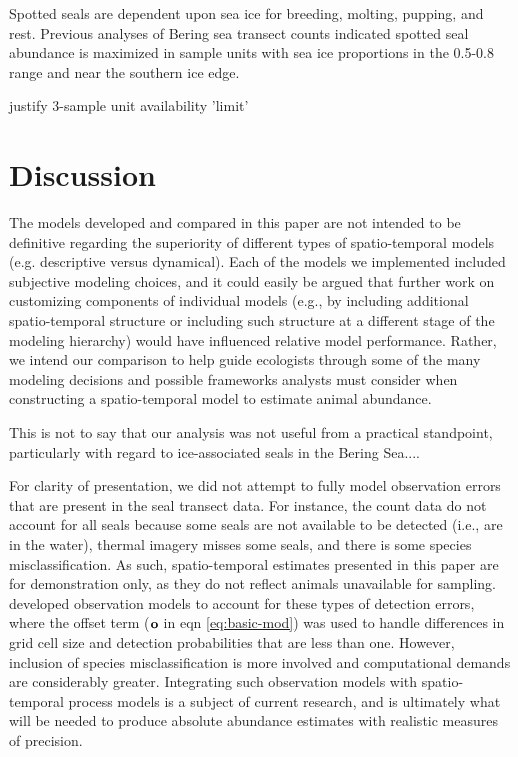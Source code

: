 \documentclass[times,mee,doublespace,]{besauth2}
\begin{document}
Spotted seals are dependent upon sea ice for breeding, molting, pupping, and rest. Previous analyses of Bering sea transect counts  \citep[e.g.]{ConnEtAl2014,VerHoefEtAl2014} indicated spotted seal abundance is maximized in sample units with sea ice proportions in the 0.5-0.8 range and near the southern ice edge.

justify 3-sample unit availability 'limit'


\section{Discussion}

The models developed and compared in this paper are not intended to be definitive regarding the superiority
of different types of spatio-temporal models (e.g. descriptive versus dynamical).  Each of the models we implemented included subjective modeling choices, and it could easily be argued that further work on customizing components of individual models (e.g., by including additional spatio-temporal structure or including such structure at a different stage of the modeling hierarchy) would have influenced relative model performance.  Rather, we intend our comparison to help guide ecologists through some of the many modeling decisions and possible frameworks analysts must consider when constructing a spatio-temporal model to estimate animal abundance.

This is not to say that our analysis was not useful from a practical standpoint, particularly with regard to ice-associated seals in the Bering Sea....

For clarity of presentation, we did not attempt to fully model observation errors that are present in the seal transect data.  For instance, the count data do not account for all seals because some seals are not available to be detected (i.e., are in the water), thermal imagery misses some seals, and there is some species misclassification. As such, spatio-temporal estimates presented in this paper are for demonstration only, as they do not reflect animals unavailable for sampling. \citet{ConnEtAl2014} developed observation models to account for these types of detection errors, where the offset term (${\bf o}$ in eqn \ref{eq:basic-mod}) was used to handle differences in grid cell size and detection probabilities that are less than one.  However, inclusion of species misclassification is more involved and computational demands are considerably greater.  Integrating such observation models with spatio-temporal process models is a subject of current research, and is ultimately what will be needed to produce absolute abundance estimates with realistic measures of precision.
\end{document}
